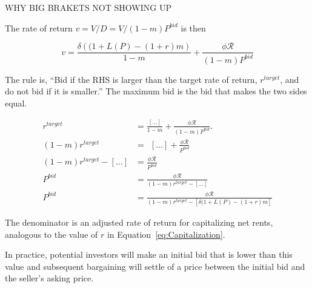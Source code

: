 WHY BIG BRAKETS NOT SHOWING UP

The rate of return $v=V/D=V/(1-m)P^{bid}$ is then

\[v= \frac{\delta \left((1+L(P) - (1+r)m\right)}{1-m} + \frac{\phi \mathcal{R}}{(1-m)P^{bid}}\]




The rule is, ``Bid if the RHS is larger than the target rate of return, $r^{target}$, and do not bid if it is smaller.''  The maximum bid  is the bid that makes the two sides equal. 

\begin{align}
r^{target} &= \frac{\left[\dots \right]}{1-m}   +\frac{\phi \mathcal{R}}{(1-m)P^{bid}}. \\
%
(1-m)r^{target} &= \ \ \left[\dots\right] + \frac{\phi \mathcal{R}}{P^{bid}}\\%
%
(1-m)r^{target}-\left[\dots\right]  &=  \frac{\phi \mathcal{R}}{P^{bid}}\\
%
P^{bid} &=    \frac{\phi \mathcal{R}}{(1-m)r^{target}-\left[ \dots\right]}\\
%
P^{bid} &=    \frac{\phi \mathcal{R}}{(1-m)r^{target}-\left[ \delta(1+L(P)- (1+r)m\right]}
\end{align}

The denominator is an adjusted rate of return for capitalizing net rents, analogous to the value of $r$ in Equation~\ref{eq:Capitalization}. 


In practice, potential investors will make an  initial  bid that is lower than this value and subsequent bargaining will settle of a price between the initial bid and the seller's asking price.


